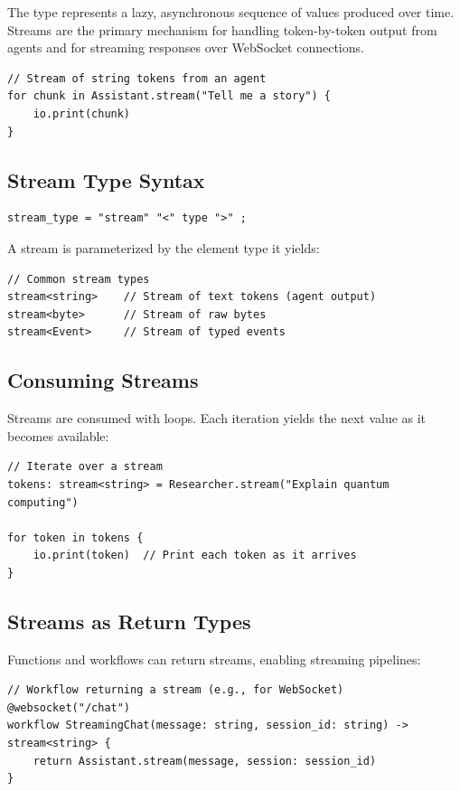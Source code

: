 The  type represents a lazy, asynchronous sequence of values produced over time. Streams are the primary mechanism for handling token-by-token output from agents and for streaming responses over WebSocket connections.

\begin{lstlisting}
// Stream of string tokens from an agent
for chunk in Assistant.stream("Tell me a story") {
    io.print(chunk)
}
\end{lstlisting}

\subsection{Stream Type Syntax}

\begin{lstlisting}[language=EBNF]
stream_type = "stream" "<" type ">" ;
\end{lstlisting}

A stream is parameterized by the element type it yields:

\begin{lstlisting}
// Common stream types
stream<string>    // Stream of text tokens (agent output)
stream<byte>      // Stream of raw bytes
stream<Event>     // Stream of typed events
\end{lstlisting}

\subsection{Consuming Streams}

Streams are consumed with  loops. Each iteration yields the next value as it becomes available:

\begin{lstlisting}
// Iterate over a stream
tokens: stream<string> = Researcher.stream("Explain quantum computing")

for token in tokens {
    io.print(token)  // Print each token as it arrives
}
\end{lstlisting}

\subsection{Streams as Return Types}

Functions and workflows can return streams, enabling streaming pipelines:

\begin{lstlisting}
// Workflow returning a stream (e.g., for WebSocket)
@websocket("/chat")
workflow StreamingChat(message: string, session_id: string) -> stream<string> {
    return Assistant.stream(message, session: session_id)
}
\end{lstlisting}

